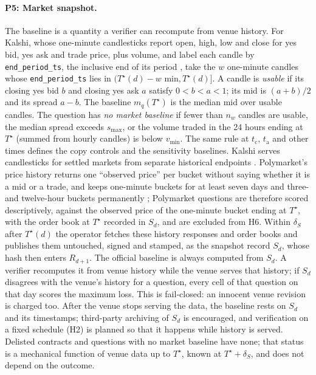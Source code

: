 \documentclass[11pt]{article}
\newcommand{\Ts}{T^{\star}}
\newcommand{\tc}{t_{\mathrm{c}}}
\newcommand{\ta}{t_{\mathrm{a}}}
\begin{document}
\paragraph{P5: Market snapshot.} The baseline is a quantity a verifier can recompute from venue history. For Kalshi, whose one-minute candlesticks report open, high, low and close for yes bid, yes ask and trade price, plus volume, and label each candle by \texttt{end\_period\_ts}, the inclusive end of its period \citep{kalshi_candlesticks}, take the $w$ one-minute candles whose \texttt{end\_period\_ts} lies in $(\Ts(d) - w\text{ min}, \Ts(d)]$. A candle is \emph{usable} if its closing yes bid $b$ and closing yes ask $a$ satisfy $0 < b < a < 1$; its mid is $(a+b)/2$ and its spread $a-b$. The baseline $m_q(\Ts)$ is the median mid over usable candles. The question has \emph{no market baseline} if fewer than $n_w$ candles are usable, the median spread exceeds $s_{\max}$, or the volume traded in the 24 hours ending at $\Ts$ (summed from hourly candles) is below $v_{\min}$. The same rule at $\tc$, $\ta$ and other times defines the copy controls and the sensitivity baselines. Kalshi serves candlesticks for settled markets from separate historical endpoints \citep{kalshi_historical}. Polymarket's price history returns one ``observed price'' per bucket without saying whether it is a mid or a trade, and keeps one-minute buckets for at least seven days and three- and twelve-hour buckets permanently \citep{polymarket_prices}; Polymarket questions are therefore scored descriptively, against the observed price of the one-minute bucket ending at $\Ts$, with the order book at $\Ts$ recorded in $S_d$, and are excluded from H6. Within $\delta_S$ after $\Ts(d)$ the operator fetches these history responses and order books and publishes them untouched, signed and stamped, as the snapshot record $S_d$, whose hash then enters $R_{d+1}$. The official baseline is always computed from $S_d$. A verifier recomputes it from venue history while the venue serves that history; if $S_d$ disagrees with the venue's history for a question, every cell of that question on that day scores the maximum loss. This is fail-closed: an innocent venue revision is charged too. After the venue stops serving the data, the baseline rests on $S_d$ and its timestamps; third-party archiving of $S_d$ is encouraged, and verification on a fixed schedule (H2) is planned so that it happens while history is served. Delisted contracts and questions with no market baseline have none; that status is a mechanical function of venue data up to $\Ts$, known at $\Ts + \delta_S$, and does not depend on the outcome.
\end{document}
